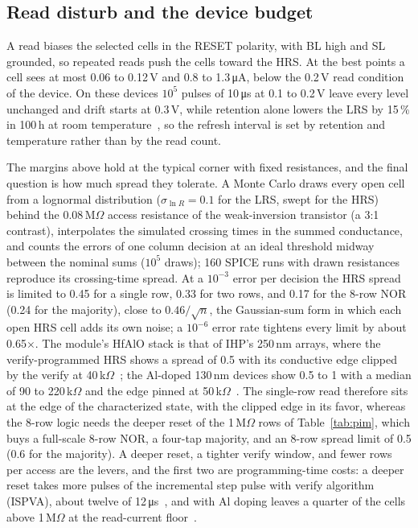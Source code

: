\subsection{Read disturb and the device budget}
A read biases the selected cells in the RESET polarity, with BL high and SL grounded, so repeated reads push the cells toward the HRS.
At the best points a cell sees at most 0.06 to 0.12\,V and 0.8 to 1.3\,\si{\micro\ampere}, below the 0.2\,V read condition of the device.
On these devices $10^5$ pulses of 10\,\si{\micro\second} at 0.1 to 0.2\,V leave every level unchanged and drift starts at 0.3\,V, while retention alone lowers the LRS by 15\,\% in 100\,h at room temperature~\cite{baroni2026drift}, so the refresh interval is set by retention and temperature rather than by the read count.

The margins above hold at the typical corner with fixed resistances, and the final question is how much spread they tolerate.
A Monte Carlo draws every open cell from a lognormal distribution ($\sigma_{\ln R}=0.1$ for the LRS, swept for the HRS) behind the 0.08\,M$\Omega$ access resistance of the weak-inversion transistor (a 3:1 contrast), interpolates the simulated crossing times in the summed conductance, and counts the errors of one column decision at an ideal threshold midway between the nominal sums ($10^5$ draws); 160 SPICE runs with drawn resistances reproduce its crossing-time spread.
At a $10^{-3}$ error per decision the HRS spread is limited to 0.45 for a single row, 0.33 for two rows, and 0.17 for the 8-row NOR (0.24 for the majority), close to $0.46/\sqrt{n}$, the Gaussian-sum form in which each open HRS cell adds its own noise; a $10^{-6}$ error rate tightens every limit by about 0.65$\times$.
The module's HfAlO stack is that of IHP's 250\,nm arrays, where the verify-programmed HRS shows a spread of 0.5 with its conductive edge clipped by the verify at 40\,k$\Omega$~\cite{perez2017hfalo}; the Al-doped 130\,nm devices show 0.5 to 1 with a median of 90 to 220\,k$\Omega$ and the edge pinned at 50\,k$\Omega$~\cite{baroni2025aldoping}.
The single-row read therefore sits at the edge of the characterized state, with the clipped edge in its favor, whereas the 8-row logic needs the deeper reset of the 1\,M$\Omega$ rows of Table~\ref{tab:pim}, which buys a full-scale 8-row NOR, a four-tap majority, and an 8-row spread limit of 0.5 (0.6 for the majority).
A deeper reset, a tighter verify window, and fewer rows per access are the levers, and the first two are programming-time costs: a deeper reset takes more pulses of the incremental step pulse with verify algorithm (ISPVA), about twelve of 12\,\si{\micro\second}~\cite{perez2017hfalo}, and with Al doping leaves a quarter of the cells above 1\,M$\Omega$ at the read-current floor~\cite{baroni2025aldoping}.

